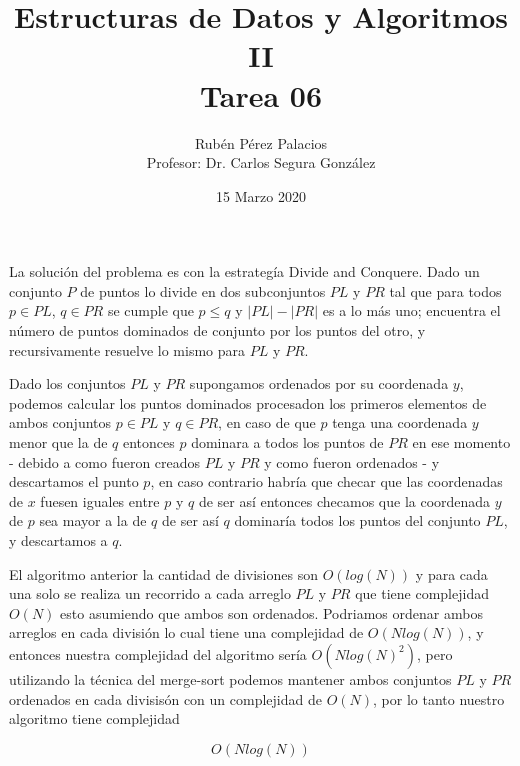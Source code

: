 \documentclass[letterpaper]{article}
\title{Estructuras de Datos y Algoritmos II\\Tarea 06}
\author{Rubén Pérez Palacios\\Profesor: Dr. Carlos Segura González}
\date{15 Marzo 2020}
\theoremstyle{definition}
\theoremstyle{definition}
\begin{document}
\maketitle

La solución del problema es con la estrategía Divide and Conquere. Dado un conjunto $P$ de puntos lo divide en dos subconjuntos $PL$ y $PR$ tal que para todos $p \in PL$, $q \in PR$ se cumple que $p \leq q$ y $|PL| - |PR|$ es a lo más uno; encuentra el número de puntos dominados de conjunto por los puntos del otro, y recursivamente resuelve lo mismo para $PL$ y $PR$.

\vspace{10pt}

Dado los conjuntos $PL$ y $PR$ supongamos ordenados por su coordenada $y$, podemos calcular los puntos dominados procesadon los primeros elementos de ambos conjuntos $p \in PL$ y $q \in PR$, en caso de que $p$ tenga una coordenada $y$ menor que la de $q$  entonces $p$ dominara a todos los puntos de $PR$ en ese momento - debido a como fueron creados $PL$ y $PR$ y como fueron ordenados - y descartamos el punto $p$, en caso contrario habría que checar que las coordenadas de $x$ fuesen iguales entre $p$ y $q$ de ser así entonces checamos que la coordenada $y$ de $p$ sea mayor a la de $q$ de ser así $q$ dominaría todos los puntos del conjunto $PL$, y descartamos a $q$.

\vspace{10pt}

El algoritmo anterior la cantidad de divisiones son $O(log(N))$ y para cada una solo se realiza un recorrido a cada arreglo $PL$ y $PR$ que tiene complejidad $O(N)$ esto asumiendo que ambos son ordenados. Podriamos ordenar ambos arreglos en cada división lo cual tiene una complejidad de $O(N log(N))$, y entonces nuestra complejidad del algoritmo sería $O(N log(N)^2)$, pero utilizando la técnica del merge-sort podemos mantener ambos conjuntos $PL$ y $PR$ ordenados en cada divisisón con un complejidad de $O(N)$, por lo tanto nuestro algoritmo tiene complejidad

\[O(N log(N))\]
\end{document}
